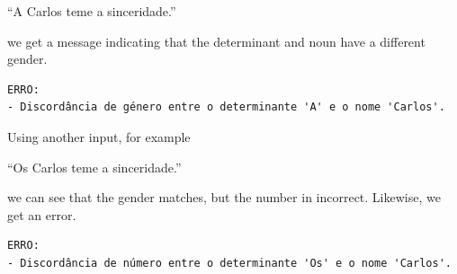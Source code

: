 ``A Carlos teme a sinceridade.''

\noindent we get a message indicating that the determinant and noun have a different gender.

\begin{center}
\begin{minipage}{15cm}
\begin{Verbatim}[frame=single, framesep=2mm, fontsize=\small]
ERRO:
- Discordância de género entre o determinante 'A' e o nome 'Carlos'.
\end{Verbatim}
\end{minipage}
\end{center}


Using another input, for example

``Os Carlos teme a sinceridade.''

\noindent we can see that the gender matches, but the number in incorrect. Likewise, we get an error.

\begin{center}
\begin{minipage}{15cm}
\begin{Verbatim}[frame=single, framesep=2mm, fontsize=\small]
ERRO:
- Discordância de número entre o determinante 'Os' e o nome 'Carlos'.
\end{Verbatim}
\end{minipage}
\end{center}

